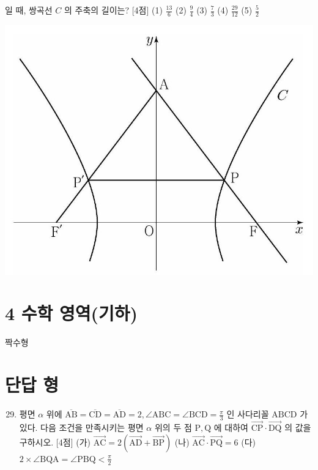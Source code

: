 \documentclass[10pt]{article}
\begin{document}
일 때, 쌍곡선 $C$ 의 주축의 길이는? [4점]
(1) $\frac{13}{6}$
(2) $\frac{9}{4}$
(3) $\frac{7}{3}$
(4) $\frac{29}{12}$
(5) $\frac{5}{2}$

\begin{center}
\includegraphics[max width=\textwidth]{2023_06_06_b380aa8523ec7afae994g-39}
\end{center}

\section{4 수학 영역(기하)}
짝수형

\section{단답 형}
\begin{enumerate}
  \setcounter{enumi}{28}
  \item 평면 $\alpha$ 위에 $\overline{\mathrm{AB}}=\overline{\mathrm{CD}}=\overline{\mathrm{AD}}=2, \angle \mathrm{ABC}=\angle \mathrm{BCD}=\frac{\pi}{3}$ 인 사다리꼴 $\mathrm{ABCD}$ 가 있다. 다음 조건을 만족시키는 평면 $\alpha$ 위의 두 점 $\mathrm{P}, \mathrm{Q}$ 에 대하여 $\overrightarrow{\mathrm{CP}} \cdot \overrightarrow{\mathrm{DQ}}$ 의 값을 구하시오. [4점]
(가) $\overrightarrow{\mathrm{AC}}=2(\overrightarrow{\mathrm{AD}}+\overrightarrow{\mathrm{BP}})$
(나) $\overrightarrow{\mathrm{AC}} \cdot \overrightarrow{\mathrm{PQ}}=6$
(다) $2 \times \angle \mathrm{BQA}=\angle \mathrm{PBQ}<\frac{\pi}{2}$
\end{enumerate}
\end{document}
